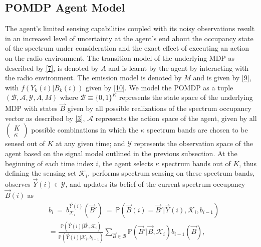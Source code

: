 \documentclass[10pt,twocolumn]{IEEEtran}
\begin{document}
\subsection{POMDP Agent Model}
The agent's limited sensing capabilities coupled with its noisy observations result in an increased level of uncertainty at the agent's end about the occupancy state of the spectrum under consideration and the exact effect of executing an action on the radio environment. The transition model of the underlying MDP as described by \eqref{7}, is denoted by $A$ and is learnt by the agent by interacting with the radio environment. The emission model is denoted by $M$ and is given by \eqref{9}, with $f(Y_k(i)|B_k(i))$ given by \eqref{10}. We model the POMDP as a tuple $(\mathcal B,\mathcal{A},\mathcal{Y},A,M)$ where $\mathcal{B}\equiv\{0,1\}^K$ represents the state space of the underlying MDP with states $\vec{B}$ given by all possible realizations of the spectrum occupancy vector as described by \eqref{3}, $\mathcal{A}$ represents the action space of the agent, given by all $\left(\begin{array}{c}K\\\kappa\end{array}\right)$ possible combinations in which the $\kappa$ spectrum bands are chosen to be sensed out of $K$ at any given time; and $\mathcal{Y}$ represents the observation space of the agent based on the signal model outlined in the previous subsection. At the beginning of each time index $i$, the agent selects $\kappa$ spectrum bands out of $K$, thus defining the sensing set $\mathcal K_i$, performs spectrum sensing  on these spectrum bands, observes $\vec{Y}(i)\in \mathcal{Y}$, and updates its belief of the current spectrum occupancy $\vec{B}(i)$ as 
\begin{align}\label{11}
&b_i\ =\ b_{\mathcal{K}_i}^{\vec{Y}(i)}(\vec{B}')\ =\ \mathbb{P}(\vec{B}(i)=\vec{B}'|\vec{Y}(i),\mathcal K_i,b_{i-1})\\&=
\nonumber
\frac{\mathbb{P}(\vec{Y}(i)|\vec{B}',\mathcal{K}_i)}{\mathbb{P}(\vec{Y}(i)|\mathcal{K}_i,b_{i-1})}\sum_{\vec{B} \in \mathcal{B}}\mathbb{P}(\vec{B}'|\vec{B},\mathcal{K}_i)b_{i-1}(\vec{B}),
\end{align}
\end{document}
